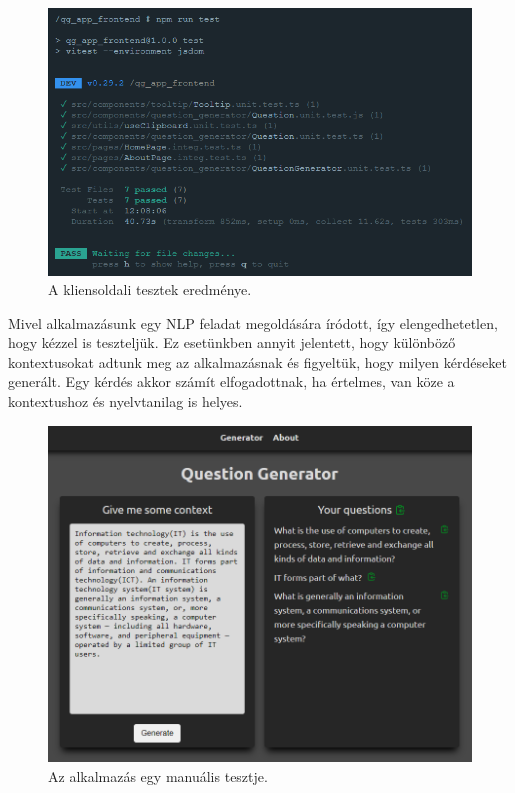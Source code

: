 \begin{figure}[h]
\centering
\includegraphics[scale=0.6]{images/test_frontend_3.png}
\caption{A kliensoldali tesztek eredménye.}
\label{fig:tf3}
\end{figure}


Mivel alkalmazásunk egy NLP feladat megoldására íródott, így elengedhetetlen, hogy kézzel is teszteljük. Ez esetünkben annyit jelentett, hogy különböző kontextusokat adtunk meg az alkalmazásnak és figyeltük, hogy milyen kérdéseket generált. Egy kérdés akkor számít elfogadottnak, ha értelmes, van köze a kontextushoz és nyelvtanilag is helyes.

\begin{figure}[h]
\centering
\includegraphics[scale=0.5]{images/test_manual.png}
\caption{Az alkalmazás egy manuális tesztje.}
\label{fig:tm}
\end{figure}

